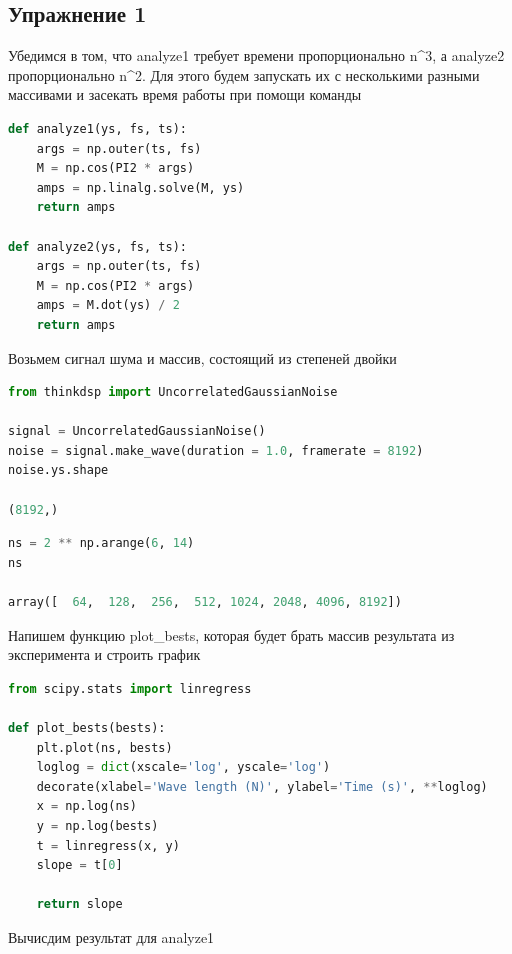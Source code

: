 \subsection{Упражнение 1}

Убедимся в том, что analyze1 требует времени пропорционально n^3, а analyze2 пропорционально n^2. Для этого будем запускать их с несколькими разными массивами и засекать время работы при помощи команды %

\begin{lstlisting}[language=Python]
def analyze1(ys, fs, ts):
    args = np.outer(ts, fs)
    M = np.cos(PI2 * args)
    amps = np.linalg.solve(M, ys)
    return amps
    
def analyze2(ys, fs, ts):
    args = np.outer(ts, fs)
    M = np.cos(PI2 * args)
    amps = M.dot(ys) / 2
    return amps
\end{lstlisting}

Возьмем сигнал шума и массив, состоящий из степеней двойки

\begin{lstlisting}[language=Python]
from thinkdsp import UncorrelatedGaussianNoise

signal = UncorrelatedGaussianNoise()
noise = signal.make_wave(duration = 1.0, framerate = 8192)
noise.ys.shape

(8192,)
\end{lstlisting}

\begin{lstlisting}[language=Python]
ns = 2 ** np.arange(6, 14)
ns

array([  64,  128,  256,  512, 1024, 2048, 4096, 8192])
\end{lstlisting}

Напишем функцию plot_bests, которая будет брать массив результата из эксперимента и строить график

\begin{lstlisting}[language=Python]
from scipy.stats import linregress

def plot_bests(bests):
    plt.plot(ns, bests)
    loglog = dict(xscale='log', yscale='log')
    decorate(xlabel='Wave length (N)', ylabel='Time (s)', **loglog)
    x = np.log(ns)
    y = np.log(bests)
    t = linregress(x, y)
    slope = t[0]

    return slope
\end{lstlisting}

Вычисдим результат для analyze1

